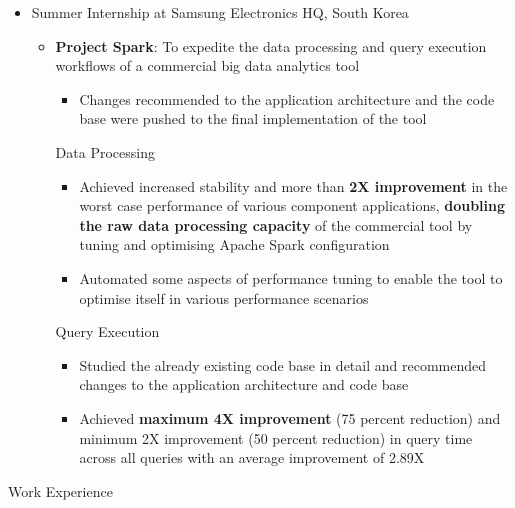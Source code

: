 \documentclass{article}
\begin{document}
\begin{itemize}[leftmargin=0.07cm]
\item {\large Summer Internship at Samsung Electronics HQ, South Korea}\hspace*{\fill}
\vspace{-0cm}
\begin{itemize}[leftmargin=0.07cm]
	\item \textbf{Project Spark}: To expedite the data processing and query execution workflows	of a commercial big data analytics tool
	\begin{itemize}
	\item Changes recommended to the application architecture and the code base were pushed to the final implementation of the tool
	\end{itemize}
	Data Processing\\ \vspace{-0.2cm}
	\begin{itemize}
	\item Achieved increased stability and more than \textbf{2X improvement} in the worst case performance of various component applications, \textbf{doubling the raw data processing capacity} of the commercial tool by tuning and optimising Apache Spark configuration
    \item Automated some aspects of performance tuning to enable the tool to optimise itself in various performance scenarios
    \end{itemize}
    \hspace{0.1cm}Query Execution\\   \vspace{-0.2cm}
	\begin{itemize}
	\item Studied the already existing code base in detail and recommended changes to the application architecture and code base
    \item Achieved \textbf{maximum 4X improvement} (75 percent reduction) and minimum 2X improvement (50 percent reduction) in query time across all queries with an average improvement of 2.89X
    \end{itemize}
\end{itemize}
\end{itemize}
\renewcommand{\labelitemi}{}
\renewcommand\labelitemii{$\circ$}
\renewcommand{\labelitemiii}{$\bullet$}
{\Large Work Experience}
\end{document}
